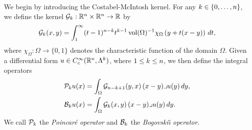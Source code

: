 \documentclass[10pt,a4paper]{article}
\begin{document}
We begin by introducing the Costabel-McIntosh kernel.
For any $k \in \{0,\dotsc,n\}$, we define the kernel ${\mathcal G}_{k} : {\mathbb R}^{n} \times {\mathbb R}^{n} \rightarrow {\mathbb R}$ by
\begin{equation}\label{math:mainkernel}
  {\mathcal G}_{k}(x,y) = \int_{1}^\infty (t-1)^{n-k}t^{k-1} \operatorname{vol}(\Omega)^{-1}\chi_{\Omega} \left(y+t(x-y)\right)\,dt
  ,
\end{equation}
where $\chi_{\Omega} : \Omega \rightarrow \{0,1\}$ denotes the characteristic function of the domain $\Omega$.
Given a differential form $u \in {C^\infty_c}({\mathbb R}^n,\Lambda^k)$, where \(1 \leq k \leq n\), 
we then define the integral operators
\begin{align*}
  {\mathcal P}_{k} u(x) &= \int_{\Omega} {\mathcal G}_{n-k+1}(y,x) \,(x-y)\lrcorner u(y)\,dy,
  \\
  {\mathcal B}_{k} u(x) &= \int_{\Omega} {\mathcal G}_{k}(x,y) \,(x-y)\lrcorner u(y)\,dy.
\end{align*}
We call ${\mathcal P}_{k}$ the \emph{Poincar\'e operator} and ${\mathcal B}_{k}$ the \emph{Bogovski\u{\i} operator}. 
\end{document}

